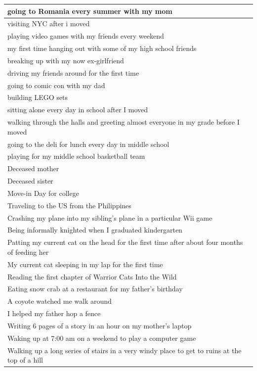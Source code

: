 \documentclass[
  .7em,
  letterpaper,
  DIV=11,
  numbers=noendperiod]{scrartcl}
\begin{document}
\begin{table}
\begin{tabular}{l}
\hline
going to Romania every summer with my mom\\
\hline
visiting NYC after i moved\\
\hline
playing video games with my friends every weekend\\
\hline
my first time hanging out with some of my high school friends\\
\hline
breaking up with my now ex-girlfriend\\
\hline
driving my friends around for the first time\\
\hline
going to comic con with my dad\\
\hline
building LEGO sets\\
\hline
sitting alone every day in school after I moved\\
\hline
walking through the halls and greeting almost everyone in my grade before I moved\\
\hline
going to the deli for lunch every day in middle school\\
\hline
playing for my middle school basketball team\\
\hline
Deceased mother\\
\hline
Deceased sister\\
\hline
Move-in Day for college\\
\hline
Traveling to the US from the Philippines\\
\hline
Crashing my plane into my sibling's plane in a particular Wii game\\
\hline
Being informally knighted when I graduated kindergarten\\
\hline
Patting my current cat on the head for the first time after about four months of feeding her\\
\hline
My current cat sleeping in my lap for the first time\\
\hline
Reading the first chapter of Warrior Cats Into the Wild\\
\hline
Eating snow crab at a restaurant for my father's birthday\\
\hline
A coyote watched me walk around\\
\hline
I helped my father hop a fence\\
\hline
Writing 6 pages of a story in an hour on my mother's laptop\\
\hline
Waking up at 7:00 am on a weekend to play a computer game\\
\hline
Walking up a long series of stairs in a very windy place to get to ruins at the top of a hill\\

\end{tabular}
\end{table}
\end{document}
